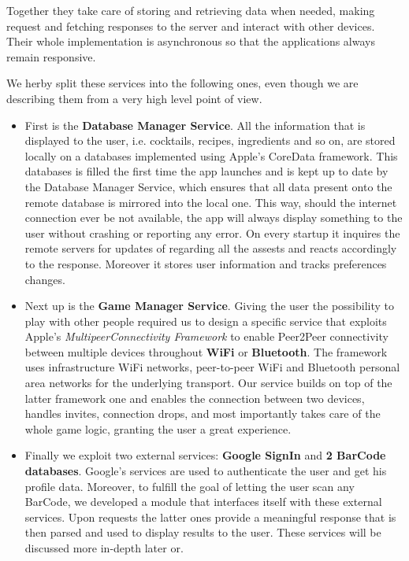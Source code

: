 \documentclass[paper=a4, fontsize=12pt]{scrartcl}
\numberwithin{equation}{section}		%
\numberwithin{figure}{section}			%
\numberwithin{table}{section}				%
\begin{document}
Together they take care of storing and retrieving data when needed, making request and fetching responses to the server and interact with other devices. Their whole implementation is asynchronous so that the applications always remain responsive.

We herby split these services into the following ones, even though we are describing them from a very high level point of view.

\begin{itemize}
\item  First is the \textbf{Database Manager Service}. All the information that is displayed to the user, i.e. cocktails, recipes, ingredients and so on, are stored locally on a databases implemented using Apple's CoreData framework. This databases is filled the first time the app launches and is kept up to date by the Database Manager Service, which ensures that all data present onto the remote database is mirrored into the local one. This way, should the internet connection ever be not available, the app will always display something to the user without crashing or reporting any error. On every startup it inquires the remote servers for updates of regarding all the assests and reacts accordingly to the response. Moreover it stores user information and tracks preferences changes.
\item Next up is the \textbf{Game Manager Service}. Giving the user the possibility to play with other people required us to design a specific service that exploits Apple's \textit{MultipeerConnectivity Framework} to enable Peer2Peer connectivity between multiple devices throughout \textbf{WiFi} or \textbf{Bluetooth}. The framework uses infrastructure WiFi networks, peer-to-peer WiFi and Bluetooth personal area networks for the underlying transport. Our service builds on top of the latter framework one and enables the connection between two devices, handles invites, connection drops, and most importantly takes care of the whole game logic, granting the user a great experience.
\item Finally we exploit two external services: \textbf{Google SignIn} and \textbf{2 BarCode databases}. Google's services are used to authenticate the user and get his profile data. Moreover, to fulfill the goal of letting the user scan any BarCode, we developed a module that interfaces itself with these external services. Upon requests the latter ones provide a meaningful response that is then parsed and used to display results to the user. These services will be discussed more in-depth later or.
\end{itemize}
\end{document}
